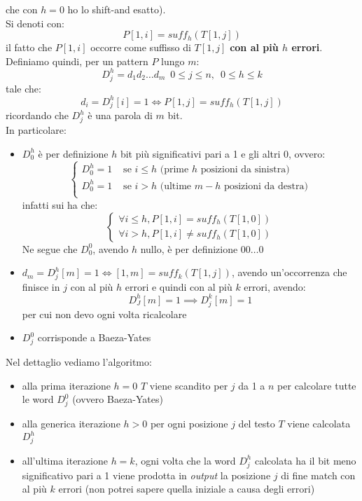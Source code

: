 che con $h=0$ ho lo shift-and esatto).\\
Si denoti con:
\[P[1,i]=suff_h(T[1,j])\]
il fatto che $P[1,i]$ occorre come suffisso di $T[1,j]$ \textbf{con al più $h$
  errori}. \\
Definiamo quindi, per un pattern $P$ lungo $m$:
\[D_j^h=d_1d_2\ldots d_m\,\,\,0\leq j\leq n,\,\,\, 0\leq h\leq k\]
tale che:
\[d_i=D_j^h[i]=1\iff P[1,j]=suff_h(T[1,j])\]
ricordando che $D_j^h$ è una parola di $m$ bit.\\
In particolare:
\begin{itemize}
  \item $D_0^h$ è per definizione $h$ bit più significativi pari a 1 e gli altri
  0, ovvero:
  \[
    \begin{cases}
      D_0^h=1&\mbox{ se } i\leq h \mbox{ (prime $h$ posizioni da sinistra)}\\
      D_0^h=1&\mbox{ se } i> h\mbox{ (ultime $m-h$ posizioni da destra)}\\
    \end{cases}
  \]
  infatti sui ha che:
  \[
    \begin{cases}
      \forall i\leq h, P[1,i]=suff_h(T[1,0])\\
      \forall i>h, P[1,i]\neq suff_h(T[1,0])
    \end{cases}
  \]
  Ne segue che $D_0^0$, avendo $h$ nullo, è per definizione $00\ldots 0$
  \item $d_m=D_j^h[m]=1\iff [1,m] = suff_k(T[1,j])$, avendo un'occorrenza che
  finisce in $j$ con al più $h$ errori e quindi con al più $k$ errori, avendo:
  \[D_J^h[m]=1\implies D_j^k[m]=1\]
  per cui non devo ogni volta ricalcolare
  \item $D_j^0$ corrisponde a Baeza-Yates
\end{itemize}
Nel dettaglio vediamo l'algoritmo:
\begin{itemize}
  \item alla prima iterazione $h=0$ $T$ viene scandito per $j$ da 1 a $n$ per
  calcolare tutte le word $D_j^0$ (ovvero Baeza-Yates)
  \item alla generica iterazione $h>0$ per ogni posizione $j$ del testo $T$
  viene calcolata $D_j^h$
  \item all'ultima iterazione $h=k$, ogni volta che la word $D_j^h$ calcolata ha
  il bit meno significativo pari a 1 viene prodotta in \textit{output} la posizione $j$ di
  fine match con al più $k$ errori (non potrei sapere quella iniziale a causa
  degli errori) 
\end{itemize}
